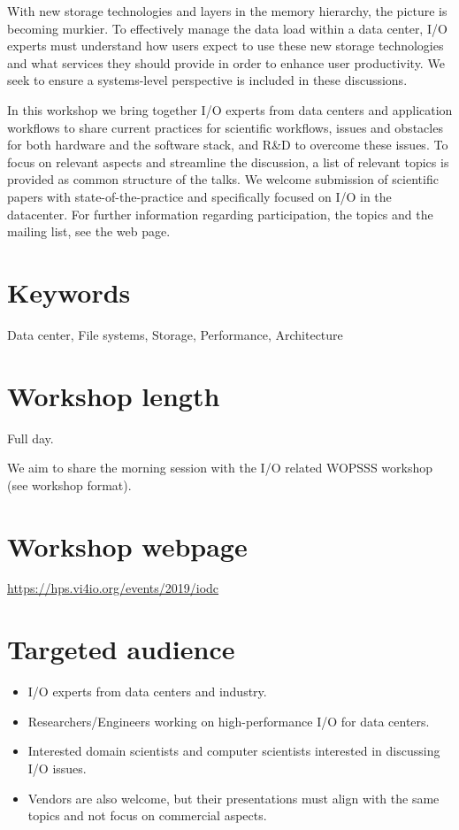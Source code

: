 \documentclass[a4paper,10pt]{article}
\begin{document}
With new storage technologies and layers in the memory hierarchy, the picture is becoming murkier.
To effectively manage the data load within a data center, I/O experts must understand how users expect to use these new storage technologies and what services they should provide in order to enhance user productivity. We seek to ensure a systems-level perspective is included in these discussions.

In this workshop we bring together I/O experts from data centers and application workflows to share current practices for scientific workflows, issues and obstacles for both hardware and the software stack, and R\&D to overcome these issues.
To focus on relevant aspects and streamline the discussion, a list of relevant topics is provided as common structure of the talks.
We welcome submission of scientific papers with state-of-the-practice and specifically focused on I/O in the datacenter.
For further information regarding participation, the topics and the mailing list, see the web page.

\section{Keywords}
Data center, File systems, Storage, Performance, Architecture

\section{Workshop length}
Full day.

We aim to share the morning session with the I/O related WOPSSS workshop (see workshop format).

\section{Workshop webpage}
\url{https://hps.vi4io.org/events/2019/iodc}


\section{Targeted audience}
\begin{itemize}
\item I/O experts from data centers and industry.
\item Researchers/Engineers working on high-performance I/O for data centers.
\item Interested domain scientists and computer scientists interested in discussing I/O issues.
\item Vendors are also welcome, but their presentations must align with the same topics and not focus on commercial aspects.
\end{itemize}
\end{document}
